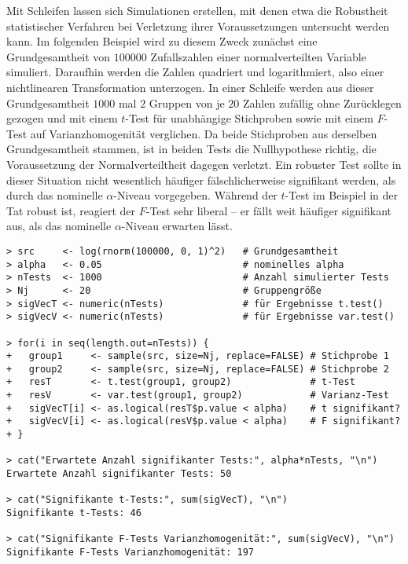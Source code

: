 Mit Schleifen lassen sich Simulationen erstellen, mit denen etwa die Robustheit statistischer Verfahren bei Verletzung ihrer Voraussetzungen untersucht werden kann. Im folgenden Beispiel wird zu diesem Zweck zunächst eine Grundgesamtheit von $100000$ Zufallszahlen einer normalverteilten Variable simuliert. Daraufhin werden die Zahlen quadriert und logarithmiert, also einer nichtlinearen Transformation unterzogen. In einer Schleife werden aus dieser Grundgesamtheit $1000$ mal $2$ Gruppen von je $20$ Zahlen zufällig ohne Zurücklegen gezogen und mit einem $t$-Test für unabhängige Stichproben sowie mit einem $F$-Test auf Varianzhomogenität verglichen. Da beide Stichproben aus derselben Grundgesamtheit stammen, ist in beiden Tests die Nullhypothese richtig, die Voraussetzung der Normalverteiltheit dagegen verletzt. Ein robuster Test sollte in dieser Situation nicht wesentlich häufiger fälschlicherweise signifikant werden, als durch das nominelle $\alpha$-Niveau vorgegeben. Während der $t$-Test im Beispiel in der Tat robust ist, reagiert der $F$-Test sehr liberal -- er fällt weit häufiger signifikant aus, als das nominelle $\alpha$-Niveau erwarten lässt.
\begin{lstlisting}
> src     <- log(rnorm(100000, 0, 1)^2)   # Grundgesamtheit
> alpha   <- 0.05                         # nominelles alpha
> nTests  <- 1000                         # Anzahl simulierter Tests
> Nj      <- 20                           # Gruppengröße
> sigVecT <- numeric(nTests)              # für Ergebnisse t.test()
> sigVecV <- numeric(nTests)              # für Ergebnisse var.test()

> for(i in seq(length.out=nTests)) {
+   group1     <- sample(src, size=Nj, replace=FALSE) # Stichprobe 1
+   group2     <- sample(src, size=Nj, replace=FALSE) # Stichprobe 2
+   resT       <- t.test(group1, group2)              # t-Test
+   resV       <- var.test(group1, group2)            # Varianz-Test
+   sigVecT[i] <- as.logical(resT$p.value < alpha)    # t signifikant?
+   sigVecV[i] <- as.logical(resV$p.value < alpha)    # F signifikant?
+ }

> cat("Erwartete Anzahl signifikanter Tests:", alpha*nTests, "\n")
Erwartete Anzahl signifikanter Tests: 50

> cat("Signifikante t-Tests:", sum(sigVecT), "\n")
Signifikante t-Tests: 46

> cat("Signifikante F-Tests Varianzhomogenität:", sum(sigVecV), "\n")
Signifikante F-Tests Varianzhomogenität: 197
\end{lstlisting}

